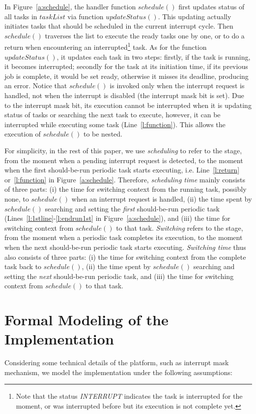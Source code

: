 \documentclass[10pt,journal]{IEEEtran}
\begin{document}
{In Figure~\ref{a:schedule}, the handler function $schedule()$ first
updates status of all tasks in $taskList$ via function
$updateStatus()$. This updating actually initiates tasks that should
be scheduled in the current interrupt cycle. Then $schedule()$
traverses the list to execute the ready tasks one by one, or to do a
return when encountering an interrupted\footnote{Note that the status
  \textit{INTERRUPT} indicates the task is interrupted for the moment,
  or was interrupted before but its execution is not complete yet.}
task. As for the function $updateStatus()$, it updates each task in
two steps: firstly, if the task is running, it becomes interrupted;
secondly for the task at its initiation time, if its previous job is
complete, it would be set ready, otherwise it misses its deadline,
producing an error. Notice that $schedule()$ is invoked only when the
interrupt request is handled, not when the interrupt is disabled (the
interrupt mask bit is set). Due to the interrupt mask bit, its
execution cannot be interrupted when it is updating status of tasks or
searching the next task to execute, however, it can be interrupted
while executing some task (Line~\ref{l:function}). This allows the
execution of $schedule()$ to be nested.

For simplicity, in the rest of this paper, we use \emph{scheduling} to
refer to the stage, from the moment when a pending interrupt request
is detected, to the moment when the first should-be-run periodic task
starts executing, i.e. Line~\ref{l:return} or~\ref{l:function} in
Figure~\ref{a:schedule}. Therefore, \emph{scheduling time} mainly
consists of three parts: (i) the time for switching context from the
running task, possibly none, to $schedule()$ when an interrupt request
is handled, (ii) the time spent by $schedule()$ searching and setting
the \emph{first} should-be-run periodic task
(Lines~\ref{l:1stline}-\ref{l:endrun1st} in Figure~\ref{a:schedule}),
and (iii) the time for switching context from $schedule()$ to that
task. \emph{Switching} refers to the stage, from the moment when a
periodic task completes its execution, to the moment when the next
should-be-run periodic task starts executing. \emph{Switching time}
thus also consists of three parts: (i) the time for switching context
from the complete task back to $schedule()$, (ii) the time spent by
$schedule()$ searching and setting the \emph{next} should-be-run
periodic task, and (iii) the time for switching context from
$schedule()$ to that task.


\section{Formal Modeling of the Implementation}
\label{s:formalism}
Considering some technical details of the platform, such as interrupt
mask mechanism, we model the implementation under the following
assumptions:

}
\end{document}
